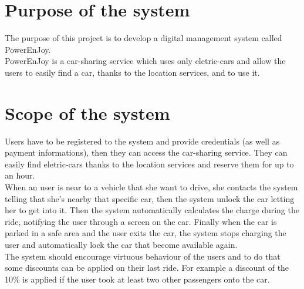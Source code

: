 \section{Purpose of the system}
The purpose of this project is to develop a digital management system called PowerEnJoy. 
\\PowerEnJoy is a car-sharing service which uses only eletric-cars and allow the users to easily find a car, thanks to the location services, and to use it. 

\section{Scope of the system}
Users have to be registered to the system and provide credentials (as well as payment informations), then they can access the car-sharing service. They can easily find eletric-cars thanks to the location services and reserve them for up to an hour. 
\\When an user is near to a vehicle that she want to drive, she contacts the system telling that she's nearby that specific car, then the system unlock the car letting her to get into it. 
Then the system automatically calculates the charge during the ride, notifying the user through a screen on the car. 
Finally when the car is parked in a \gls{safe area} and the user exits the car, the system stops charging the user and automatically lock the car that become available again.
\\The system should encourage virtuous behaviour of the users and to do that some discounts can be applied on their last ride. For example a discount of the 10\% is applied if the user took at least two other passengers onto the car. 
\begin{comment}
Other discounts are applied if a car is left with no more than 50\% of the battery empty or if the user left the car in a special park where it can be recharged(20\%) 
and she takes care of plugging the car into the power grid (30\%). 
\\On the other side the system charges 30\% more on the last ride if the car is left at more than 3 Km from the nearest power grid station or with more than 80\% of the battery empty in order to compensate for the cost required to re-charge the car on-site.
\end{comment}

